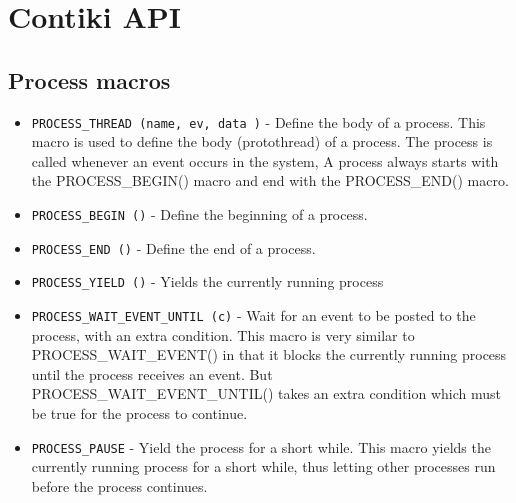 \chapter{Contiki API}
\section{Process macros}
\begin{itemize}
\item \texttt{PROCESS\_THREAD (name, ev, data )} - Define the body of a process.
This macro is used to define the body (protothread) of a process. 
The process is called whenever an event occurs in the system, 
A process always starts with the PROCESS\_BEGIN() macro and end with the PROCESS\_END() macro. 
\item \texttt{PROCESS\_BEGIN ()} - Define the beginning of a process. 
\item \texttt{PROCESS\_END ()} - Define the end of a process. 
\item \texttt{PROCESS\_YIELD ()} - Yields the currently running process
\item \texttt{PROCESS\_WAIT\_EVENT\_UNTIL (c)} - Wait for an event to be posted to the process, with an extra condition.
This macro is very similar to PROCESS\_WAIT\_EVENT() in that it blocks the currently running process until the process receives 
an event. But PROCESS\_WAIT\_EVENT\_UNTIL() takes an extra condition which must be true for the process to continue.
\item \texttt{PROCESS\_PAUSE} - Yield the process for a short while.
This macro yields the currently running process for a short while, thus letting other processes run before the process continues. 
\end{itemize}

